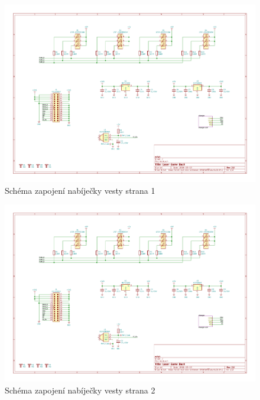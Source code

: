 \begin{landscape}
    \begin{figure}[h]
        \centering
        \includegraphics[page=1, height=\textwidth]{sch/back}
        \caption{Schéma zapojení nabíječky vesty strana 1}
    \end{figure}
\end{landscape}
\begin{landscape}
    \begin{figure}[h]
        \centering
        \includegraphics[page=2, height=\textwidth]{sch/back}
        \caption{Schéma zapojení nabíječky vesty strana 2}
    \end{figure}
\end{landscape}


